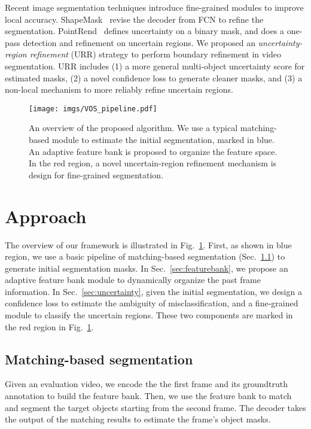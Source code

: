 \documentclass{article}
\begin{document}
Recent image segmentation techniques introduce fine-grained modules to improve local accuracy.
ShapeMask~\cite{kuo_shapemask_2019} revise the decoder from FCN to refine the segmentation.
PointRend~\cite{kirillov_pointrend_2020} defines uncertainty on a binary mask, and does a one-pass detection and refinement on uncertain regions. 
We proposed an \emph{uncertainty-region refinement} (URR) strategy to perform boundary refinement in video segmentation. 
URR includes (1) a more general multi-object uncertainty score for estimated masks, (2) a novel confidence loss to generate cleaner masks, and (3) a non-local mechanism to more reliably refine uncertain regions.


\begin{figure}
    \centering
    \texttt{[image: imgs/VOS\_pipeline.pdf]}
    \caption{An overview of the proposed algorithm. We use a typical matching-based module to estimate the initial segmentation, marked in blue. An adaptive feature bank is proposed to organize the feature space. In the red region, a novel uncertain-region refinement mechanism is design for fine-grained segmentation.}
    \label{fig:pipeline}
\end{figure}

\section{Approach}

The overview of our framework is illustrated in Fig.~\ref{fig:pipeline}.
First, as shown in blue region, we use a basic pipeline of matching-based segmentation (Sec.~\ref{sec:baseline}) to generate initial segmentation masks.
In Sec.~\ref{sec:featurebank}, we propose an adaptive feature bank module to dynamically organize the past frame information.
In Sec.~\ref{sec:uncertainty}, given the initial segmentation, we design a confidence loss to estimate the ambiguity of misclassification, and a fine-grained module to classify the uncertain regions.
These two components are marked in the red region in Fig.~\ref{fig:pipeline}.

\subsection{Matching-based segmentation}
\label{sec:baseline}


Given an evaluation video, we encode the the first frame and its groundtruth annotation to build the feature bank. 
Then, we use the feature bank to match and segment the target objects starting from the second frame. 
The decoder takes the output of the matching results to estimate the frame's object masks.
\end{document}
